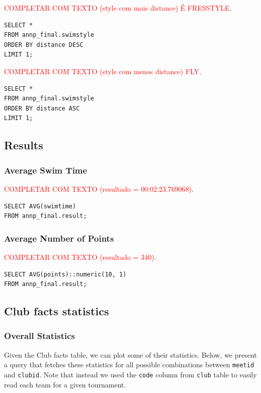 \textcolor{red}{COMPLETAR COM TEXTO (style com mais distance) É FRESSTYLE}.

\begin{verbatim}
SELECT *
FROM annp_final.swimstyle
ORDER BY distance DESC
LIMIT 1;
\end{verbatim}

\textcolor{red}{COMPLETAR COM TEXTO (style com menos distance) FLY}.

\begin{verbatim}
SELECT *
FROM annp_final.swimstyle
ORDER BY distance ASC
LIMIT 1;
\end{verbatim}

\subsection{Results}

\subsubsection{Average Swim Time}

\textcolor{red}{COMPLETAR COM TEXTO (resultado = 00:02:23.769068)}.

\begin{verbatim}
SELECT AVG(swimtime)
FROM annp_final.result;
\end{verbatim}

\subsubsection{Average Number of Points}

\textcolor{red}{COMPLETAR COM TEXTO (resultado = 340)}.
\begin{verbatim}
SELECT AVG(points)::numeric(10, 1)
FROM annp_final.result;
\end{verbatim}

\subsection{Club facts statistics}

\subsubsection{Overall Statistics}

Given the Club facts table, we can plot some of their statistics. Below, we present a query that fetches these statistics for all possible combinations
between \texttt{meetid} and \texttt{clubid}. Note that instead we used the \texttt{code} column from \texttt{club} table to easily read each team for 
a given tournament. 

